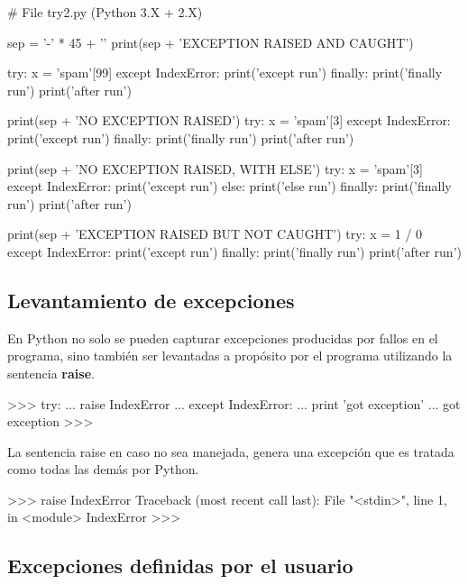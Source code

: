 \begin{pyglist} [language=python]
# File try2.py (Python 3.X + 2.X)

sep = '-' * 45 + '\n'
print(sep + 'EXCEPTION RAISED AND CAUGHT')

try:
    x = 'spam'[99]
except IndexError:
    print('except run')
finally:
    print('finally run')
    print('after run')

print(sep + 'NO EXCEPTION RAISED')
try:
    x = 'spam'[3]
except IndexError:
    print('except run')
finally:
    print('finally run')
    print('after run')

print(sep + 'NO EXCEPTION RAISED, WITH ELSE')
try:
    x = 'spam'[3]
except IndexError:
    print('except run')
else:
    print('else run')
finally:
    print('finally run')
    print('after run')


print(sep + 'EXCEPTION RAISED BUT NOT CAUGHT')
try:
    x = 1 / 0
except IndexError:
    print('except run')
finally:
    print('finally run')
    print('after run')
\end{pyglist}
  

\subsection{Levantamiento de excepciones}

En Python no solo se pueden capturar excepciones producidas por fallos en el programa, sino también ser levantadas a propósito por el programa utilizando la sentencia \textbf{raise}.\\

\begin{pyglist} [language=python]
>>> try:
...     raise IndexError
... except IndexError:
...     print 'got exception'
... 
got exception
>>> 
\end{pyglist}

La sentencia raise en caso no sea manejada, genera una excepción que es tratada como todas las demás por Python.\\

\begin{pyglist} [language=python]
>>> raise IndexError
Traceback (most recent call last):
  File "<stdin>", line 1, in <module>
IndexError
>>> 
\end{pyglist}

\subsection{Excepciones definidas por el usuario}

